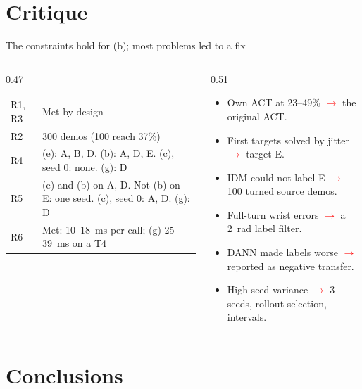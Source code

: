 \documentclass[aspectratio=169,11pt]{beamer}
\def\topicname{}
\newcommand{\topic}[1]{\gdef\topicname{#1}}
\newcommand{\topicsection}[1]{\section{#1}\topic{#1}}
\newcommand{\fix}{\textcolor{red}{$\rightarrow$}}
\begin{document}
\topicsection{Critique}

\begin{frame}{The constraints hold for (b); most problems led to a fix}
  \begin{columns}[T]
    \begin{column}{0.47\textwidth}
      \footnotesize
      \begin{tabular}{@{}lp{4.8cm}@{}}
        \toprule
        R1, R3 & Met by design \\
        R2 & 300 demos (100 reach 37\%) \\
        R4 & (e): A, B, D. (b): A, D, E. (c), seed 0: none. (g): D \\
        R5 & (e) and (b) on A, D. Not (b) on E: one seed. (c), seed 0: A, D. (g): D \\
        R6 & Met: 10--18~ms per call; (g) 25--39~ms on a T4 \\
        \bottomrule
      \end{tabular}
    \end{column}
    \begin{column}{0.51\textwidth}
      \footnotesize
      \begin{itemize}
        \item Own ACT at 23--49\% \fix{} the original ACT.
        \item First targets solved by jitter \fix{} target E.
        \item IDM could not label E \fix{} 100 turned source demos.
        \item Full-turn wrist errors \fix{} a 2~rad label filter.
        \item DANN made labels worse \fix{} reported as negative transfer.
        \item High seed variance \fix{} 3 seeds, rollout selection, intervals.
      \end{itemize}
    \end{column}
  \end{columns}
\end{frame}

\topicsection{Conclusions}
\end{document}
